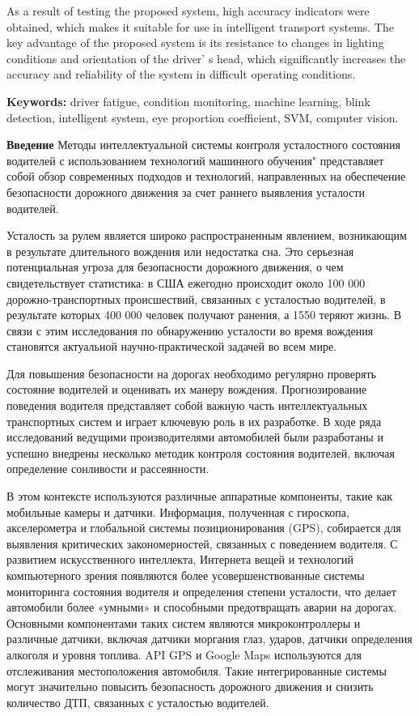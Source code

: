 As a result of testing the proposed system, high accuracy indicators
were obtained, which makes it suitable for use in intelligent transport
systems. The key advantage of the proposed system is its resistance to
changes in lighting conditions and orientation of the
driver' s head, which significantly increases the
accuracy and reliability of the system in difficult operating
conditions.

{\bfseries Keywords:} driver fatigue, condition monitoring, machine
learning, blink detection, intelligent system, eye proportion
coefficient, SVM, computer vision.

\begin{multicols}{2}
{\bfseries Введение} Методы интеллектуальной системы контроля усталостного
состояния водителей с использованием технологий машинного обучения"
представляет собой обзор современных подходов и технологий, направленных
на обеспечение безопасности дорожного движения за счет раннего выявления
усталости водителей.

Усталость за рулем является широко распространенным явлением,
возникающим в результате длительного вождения или недостатка сна. Это
серьезная потенциальная угроза для безопасности дорожного движения, о
чем свидетельствует статистика: в США ежегодно происходит около 100 000
дорожно-транспортных происшествий, связанных с усталостью водителей, в
результате которых 400 000 человек получают ранения, а 1550 теряют
жизнь. В связи с этим исследования по обнаружению усталости во время
вождения становятся актуальной научно-практической задачей во всем мире.

Для повышения безопасности на дорогах необходимо регулярно проверять
состояние водителей и оценивать их манеру вождения. Прогнозирование
поведения водителя представляет собой важную часть интеллектуальных
транспортных систем и играет ключевую роль в их разработке. В ходе ряда
исследований ведущими производителями автомобилей были разработаны и
успешно внедрены несколько методик контроля состояния водителей, включая
определение сонливости и рассеянности.

В этом контексте используются различные аппаратные компоненты, такие как
мобильные камеры и датчики. Информация, полученная с гироскопа,
акселерометра и глобальной системы позиционирования (GPS), собирается
для выявления критических закономерностей, связанных с поведением
водителя. С развитием искусственного интеллекта, Интернета вещей и
технологий компьютерного зрения появляются более усовершенствованные
системы мониторинга состояния водителя и определения степени усталости,
что делает автомобили более «умными» и способными предотвращать аварии
на дорогах. Основными компонентами таких систем являются
микроконтроллеры и различные датчики, включая датчики моргания глаз,
ударов, датчики определения алкоголя и уровня топлива. API GPS и Google
Maps используются для отслеживания местоположения автомобиля. Такие
интегрированные системы могут значительно повысить безопасность
дорожного движения и снизить количество ДТП, связанных с усталостью
водителей.


\end{multicols}
